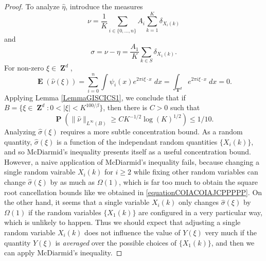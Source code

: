 \documentclass[12pt,reqno]{article}
\numberwithin{equation}{section}
\DeclareMathOperator{\ZZ}{\mathbf{Z}}
\DeclareMathOperator{\TT}{\mathbf{T}}
\numberwithin{theorem}{section}
\DeclareMathOperator{\EE}{\mathbf{E}}
\DeclareMathOperator{\PP}{\mathbf{P}}
\begin{document}
\begin{proof}
    To analyze $\widehat{\eta}$, introduce the measures
    \[ \nu = \frac{1}{K} \sum_{i \in \{ 0, \dots, n \}} A_i \sum_{k = 1}^K \delta_{X_i(k)} \]
    and
    \[ \sigma = \nu - \eta = \frac{A_1}{K} \sum_{k \in S} \delta_{X_1(k)}. \]
    For non-zero $\xi \in \ZZ^d$,
    \begin{equation}
        \EE(\widehat{\nu}(\xi)) = \sum_{i = 0}^n \int \psi_i(x) e^{2 \pi i \xi \cdot x}\; dx = \int_{\TT^d} e^{2 \pi i \xi \cdot x}\; dx = 0.
    \end{equation}
    Applying Lemma \ref{LemmaGISCICS1}, we conclude that if $B = \{ \xi \in \ZZ^d: 0 < |\xi| < K^{100/\beta} \}$, then there is $C > 0$ such that
    \begin{equation} \label{equationCOIACOIAJCPPPPP}
        \PP \left( \| \widehat{\nu} \|_{L^\infty(B)} \geq C K^{-1/2} \log(K)^{1/2} \right) \leq 1/10.
    \end{equation}
    Analyzing $\widehat{\sigma}(\xi)$ requires a more subtle concentration bound. As a random quantity, $\widehat{\sigma}(\xi)$ is a function of the independant random quantities $\{ X_i(k) \}$, and so McDiarmid's inequality presents itself as a useful concentration bound. However, a naive application of McDiarmid's inequality fails, because changing a single random vairable $X_i(k)$ for $i \geq 2$ while fixing other random variables can change $\widehat{\sigma}(\xi)$ by as much as $\Omega(1)$, which is far too much to obtain the square root cancellation bounds like we obtained in \eqref{equationCOIACOIAJCPPPPP}. On the other hand, it seems that a single variable $X_i(k)$ only changes $\widehat{\sigma}(\xi)$ by $\Omega(1)$ if the random variables $\{ X_1(k) \}$ are configured in a very particular way, which is unlikely to happen. Thus we should expect that adjusting a single random variable $X_i(k)$ does not influence the value of $Y(\xi)$ very much if the quantity $Y(\xi)$ is \emph{averaged} over the possible choices of $\{ X_1(k) \}$, and then we can apply McDiarmid's inequality.


\end{proof}
\end{document}
